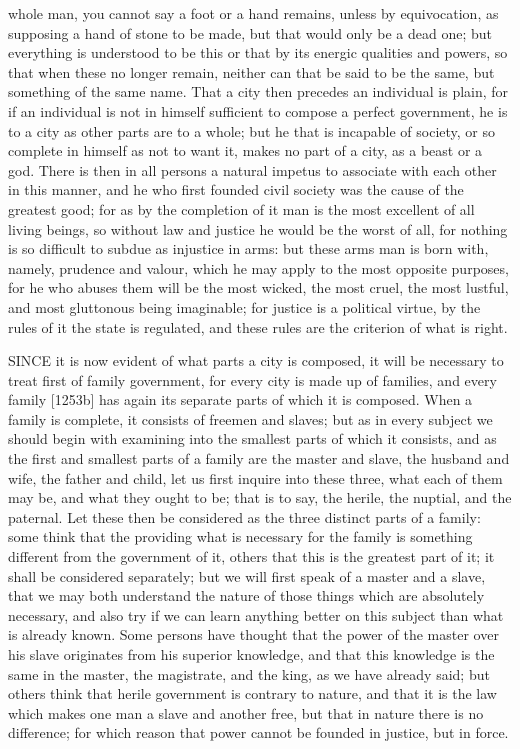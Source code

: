 whole man, you cannot say a foot or a hand remains, unless by
equivocation, as supposing a hand of stone to be made, but that would only
be a dead one; but everything is understood to be this or that by its
energic qualities and powers, so that when these no longer remain, neither
can that be said to be the same, but something of the same name. That a
city then precedes an individual is plain, for if an individual is not in
himself sufficient to compose a perfect government, he is to a city as
other parts are to a whole; but he that is incapable of society, or so
complete in himself as not to want it, makes no part of a city, as a beast
or a god. There is then in all persons a natural impetus to associate with
each other in this manner, and he who first founded civil society was the
cause of the greatest good; for as by the completion of it man is the most
excellent of all living beings, so without law and justice he would be the
worst of all, for nothing is so difficult to subdue as injustice in arms:
but these arms man is born with, namely, prudence and valour, which he may
apply to the most opposite purposes, for he who abuses them will be the
most wicked, the most cruel, the most lustful, and most gluttonous being
imaginable; for justice is a political virtue, by the rules of it the
state is regulated, and these rules are the criterion of what is right.


SINCE it is now evident of what parts a city is composed, it will be
necessary to treat first of family government, for every city is made up
of families, and every family [1253b] has again its separate parts of
which it is composed. When a family is complete, it consists of freemen
and slaves; but as in every subject we should begin with examining into
the smallest parts of which it consists, and as the first and smallest
parts of a family are the master and slave, the husband and wife, the
father and child, let us first inquire into these three, what each of them
may be, and what they ought to be; that is to say, the herile, the
nuptial, and the paternal. Let these then be considered as the three
distinct parts of a family: some think that the providing what is
necessary for the family is something different from the government of it,
others that this is the greatest part of it; it shall be considered
separately; but we will first speak of a master and a slave, that we may
both understand the nature of those things which are absolutely necessary,
and also try if we can learn anything better on this subject than what is
already known. Some persons have thought that the power of the master over
his slave originates from his superior knowledge, and that this knowledge
is the same in the master, the magistrate, and the king, as we have
already said; but others think that herile government is contrary to
nature, and that it is the law which makes one man a slave and another
free, but that in nature there is no difference; for which reason that
power cannot be founded in justice, but in force.

